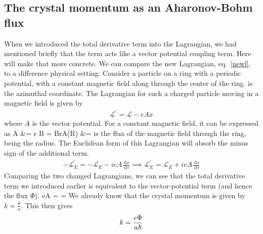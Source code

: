 \documentclass[12pt]{article}
\begin{document}
\subsection*{The crystal momentum as an Aharonov-Bohm flux}
When we introduced the total derivative term into the Lagrangian, we had mentioned briefly that the term acts like a vector potential coupling term. Here will make that more concrete. We can compare the new Lagrangian, eq.~\ref{newl}, to a difference physical setting. Consider a particle on a ring with a periodic potential, with a constant magnetic field  along  through the center of the ring. \il{\phi} is the azimuthal coordinate. The Lagrangian for such a charged particle moving in a magnetic field is given by
\begin{equation}\begin{aligned}
	\mathcal{L}^\prime = \mathcal{L} - eA \dot x
\end{aligned}\end{equation}
where \(A\) is the vector potential. For a constant magnetic field, it can be expressed as
\beq
\vec A &= \vec r \times \vec B = Br\hat \phi \implies A(R) &= 
\eeq
{} is the flux of the magnetic field through the ring,  being the radius. 
The Euclidean form of this Lagrangian will absorb the minus sign of the additional term.
\begin{equation}\begin{aligned}
	-\mathcal{L}_E^\prime = -\mathcal{L}_E - ieA \frac{\:\mathrm{d}x}{\:\mathrm{d}\tau} \implies \mathcal{L}_E^\prime = \mathcal{L}_E + ieA \frac{\:\mathrm{d}x}{\:\mathrm{d}\tau}
\end{aligned}\end{equation}
Comparing the two changed Lagrangians, we can see that the total derivative term we introduced earlier is equivalent to the vector-potential term (and hence the flux \(\Phi\)).
\beq[sakura]
eA =  \implies \theta = 
\eeq
We already know that the crystal momentum is given by \(k = \frac{\theta}{a}\). This then gives
\begin{equation}\begin{aligned}
k = \frac{e\Phi}{a\hbar}
\end{aligned}\end{equation}
\end{document}
